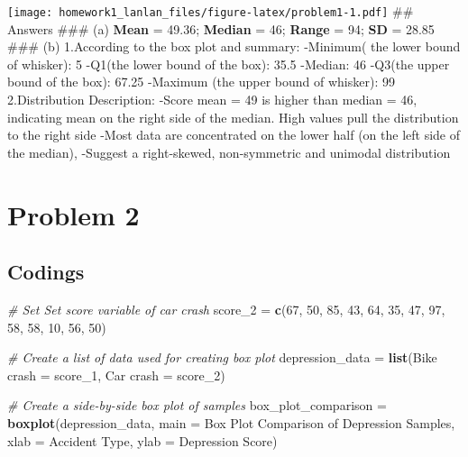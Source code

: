 \documentclass[
]{article}
\newenvironment{Shaded}{\begin{snugshade}}{\end{snugshade}}
\newcommand{\AttributeTok}[1]{\textcolor[rgb]{0.13,0.29,0.53}{#1}}
\newcommand{\CommentTok}[1]{\textcolor[rgb]{0.56,0.35,0.01}{\textit{#1}}}
\newcommand{\DecValTok}[1]{\textcolor[rgb]{0.00,0.00,0.81}{#1}}
\newcommand{\FunctionTok}[1]{\textcolor[rgb]{0.13,0.29,0.53}{\textbf{#1}}}
\newcommand{\NormalTok}[1]{#1}
\newcommand{\OtherTok}[1]{\textcolor[rgb]{0.56,0.35,0.01}{#1}}
\newcommand{\StringTok}[1]{\textcolor[rgb]{0.31,0.60,0.02}{#1}}
\begin{document}
\texttt{[image: homework1\_lanlan\_files/figure-latex/problem1-1.pdf]}
\#\# Answers \#\#\# (a) \textbf{Mean} = 49.36; \textbf{Median} = 46;
\textbf{Range} = 94; \textbf{SD} = 28.85 \#\#\# (b) 1.According to the
box plot and summary: -Minimum( the lower bound of whisker): 5 -Q1(the
lower bound of the box): 35.5 -Median: 46 -Q3(the upper bound of the
box): 67.25 -Maximum (the upper bound of whisker): 99 2.Distribution
Description: -Score mean = 49 is higher than median = 46, indicating
mean on the right side of the median. High values pull the distribution
to the right side -Most data are concentrated on the lower half (on the
left side of the median), -Suggest a right-skewed, non-symmetric and
unimodal distribution

\section{Problem 2}\label{problem-2}

\subsection{Codings}\label{codings-1}

\begin{Shaded}
\begin{Highlighting}[]
\CommentTok{\# Set Set score variable of car crash}
\NormalTok{score\_2 }\OtherTok{=} \FunctionTok{c}\NormalTok{(}\DecValTok{67}\NormalTok{, }\DecValTok{50}\NormalTok{, }\DecValTok{85}\NormalTok{, }\DecValTok{43}\NormalTok{, }\DecValTok{64}\NormalTok{, }\DecValTok{35}\NormalTok{, }\DecValTok{47}\NormalTok{, }\DecValTok{97}\NormalTok{, }\DecValTok{58}\NormalTok{, }\DecValTok{58}\NormalTok{, }\DecValTok{10}\NormalTok{, }\DecValTok{56}\NormalTok{, }\DecValTok{50}\NormalTok{)}

\CommentTok{\# Create a list of data used for creating box plot}
\NormalTok{depression\_data }\OtherTok{=} \FunctionTok{list}\NormalTok{(}\StringTok{\textquotesingle{}Bike crash\textquotesingle{}} \OtherTok{=}\NormalTok{ score\_1,}
            \StringTok{\textquotesingle{}Car crash\textquotesingle{}} \OtherTok{=}\NormalTok{ score\_2)}

\CommentTok{\# Create a side{-}by{-}side box plot of samples}
\NormalTok{box\_plot\_comparison }\OtherTok{=} \FunctionTok{boxplot}\NormalTok{(depression\_data, }\AttributeTok{main =} \StringTok{\textquotesingle{}Box Plot Comparison of Depression Samples\textquotesingle{}}\NormalTok{,}
        \AttributeTok{xlab =} \StringTok{\textquotesingle{}Accident Type\textquotesingle{}}\NormalTok{,}
        \AttributeTok{ylab =} \StringTok{\textquotesingle{}Depression Score\textquotesingle{}}\NormalTok{)}
\end{Highlighting}
\end{Shaded}
\end{document}
